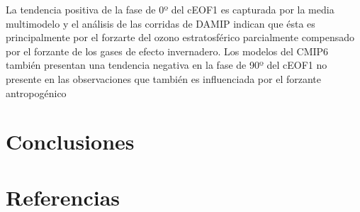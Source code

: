 \documentclass[12pt,oneside,a4paper]{reedthesis}
\begin{document}
La tendencia positiva de la fase de 0º del cEOF1 es capturada por la media multimodelo y el análisis de las corridas de DAMIP indican que ésta es principalmente por el forzarte del ozono estratosférico parcialmente compensado por el forzante de los gases de efecto invernadero.
Los modelos del CMIP6 también presentan una tendencia negativa en la fase de 90º del cEOF1 no presente en las observaciones que también es influenciada por el forzante antropogénico

\hypertarget{conclusiones-3}{%
\chapter{Conclusiones}\label{conclusiones-3}}

\backmatter

\hypertarget{referencias}{%
\chapter*{Referencias}\label{referencias}}


\noindent

\setlength{\parindent}{-0.20in}
\end{document}
